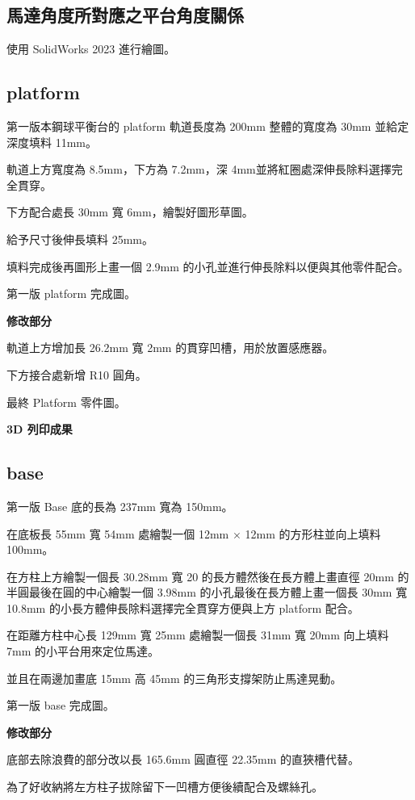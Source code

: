 \subsection*{馬達角度所對應之平台角度關係}

使用 SolidWorks 2023 進行繪圖。

\subsection*{platform}

第一版本鋼球平衡台的 platform 軌道長度為 200mm 整體的寬度為 30mm 並給定深度填料 11mm。

軌道上方寬度為 8.5mm，下方為 7.2mm，深 4mm並將紅圈處深伸長除料選擇完全貫穿。

下方配合處長 30mm 寬 6mm，繪製好圖形草圖。

給予尺寸後伸長填料 25mm。

填料完成後再圖形上畫一個 2.9mm 的小孔並進行伸長除料以便與其他零件配合。

第一版 platform 完成圖。

\textbf{修改部分}

軌道上方增加長 26.2mm 寬 2mm 的貫穿凹槽，用於放置感應器。

下方接合處新增 R10 圓角。

最終 Platform 零件圖。

\textbf{3D 列印成果}

\subsection*{base}

第一版 Base 底的長為 237mm 寬為 150mm。

在底板長 55mm 寬 54mm 處繪製一個 12mm $\times$ 12mm 的方形柱並向上填料 100mm。

在方柱上方繪製一個長 30.28mm 寬 20 的長方體然後在長方體上畫直徑 20mm 的半圓最後在圓的中心繪製一個 3.98mm 的小孔最後在長方體上畫一個長 30mm 寬 10.8mm 的小長方體伸長除料選擇完全貫穿方便與上方 platform 配合。

在距離方柱中心長 129mm 寬 25mm 處繪製一個長 31mm 寬 20mm 向上填料 7mm 的小平台用來定位馬達。

並且在兩邊加畫底 15mm 高 45mm 的三角形支撐架防止馬達晃動。

第一版 base 完成圖。

\textbf{修改部分}

底部去除浪費的部分改以長 165.6mm 圓直徑 22.35mm 的直狹槽代替。

為了好收納將左方柱子拔除留下一凹槽方便後續配合及螺絲孔。

